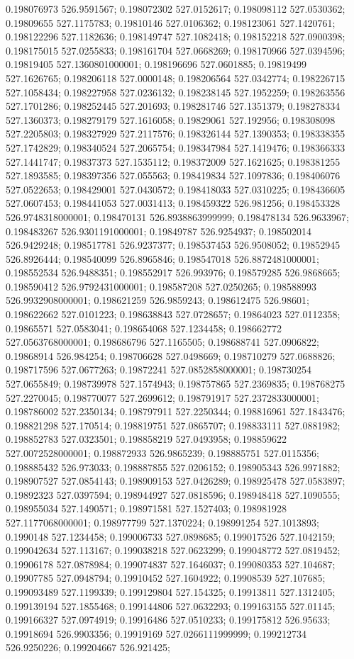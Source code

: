 0.198076973 526.9591567; 0.198072302 527.0152617; 0.198098112 527.0530362; 0.19809655 527.1175783; 0.19810146 527.0106362; 0.198123061 527.1420761; 0.198122296 527.1182636; 0.198149747 527.1082418; 0.198152218 527.0900398; 0.198175015 527.0255833; 0.198161704 527.0668269; 0.198170966 527.0394596; 0.19819405 527.1360801000001; 0.198196696 527.0601885; 0.19819499 527.1626765; 0.198206118 527.0000148; 0.198206564 527.0342774; 0.198226715 527.1058434; 0.198227958 527.0236132; 0.198238145 527.1952259; 0.198263556 527.1701286; 0.198252445 527.201693; 0.198281746 527.1351379; 0.198278334 527.1360373; 0.198279179 527.1616058; 0.19829061 527.192956; 0.198308098 527.2205803; 0.198327929 527.2117576; 0.198326144 527.1390353; 0.198338355 527.1742829; 0.198340524 527.2065754; 0.198347984 527.1419476; 0.198366333 527.1441747; 0.19837373 527.1535112; 0.198372009 527.1621625; 0.198381255 527.1893585; 0.198397356 527.055563; 0.198419834 527.1097836; 0.198406076 527.0522653; 0.198429001 527.0430572; 0.198418033 527.0310225; 0.198436605 527.0607453; 0.198441053 527.0031413; 0.198459322 526.981256; 0.198453328 526.9748318000001; 0.198470131 526.8938863999999; 0.198478134 526.9633967; 0.198483267 526.9301191000001; 0.19849787 526.9254937; 0.198502014 526.9429248; 0.198517781 526.9237377; 0.198537453 526.9508052; 0.19852945 526.8926444; 0.198540099 526.8965846; 0.198547018 526.8872481000001; 0.198552534 526.9488351; 0.198552917 526.993976; 0.198579285 526.9868665; 0.198590412 526.9792431000001; 0.198587208 527.0250265; 0.198588993 526.9932908000001; 0.198621259 526.9859243; 0.198612475 526.98601; 0.198622662 527.0101223; 0.198638843 527.0728657; 0.19864023 527.0112358; 0.19865571 527.0583041; 0.198654068 527.1234458; 0.198662772 527.0563768000001; 0.198686796 527.1165505; 0.198688741 527.0906822; 0.19868914 526.984254; 0.198706628 527.0498669; 0.198710279 527.0688826; 0.198717596 527.0677263; 0.19872241 527.0852858000001; 0.198730254 527.0655849; 0.198739978 527.1574943; 0.198757865 527.2369835; 0.198768275 527.2270045; 0.198770077 527.2699612; 0.198791917 527.2372833000001; 0.198786002 527.2350134; 0.198797911 527.2250344; 0.198816961 527.1843476; 0.198821298 527.170514; 0.198819751 527.0865707; 0.198833111 527.0881982; 0.198852783 527.0323501; 0.198858219 527.0493958; 0.198859622 527.0072528000001; 0.198872933 526.9865239; 0.198885751 527.0115356; 0.198885432 526.973033; 0.198887855 527.0206152; 0.198905343 526.9971882; 0.198907527 527.0854143; 0.198909153 527.0426289; 0.198925478 527.0583897; 0.19892323 527.0397594; 0.198944927 527.0818596; 0.198948418 527.1090555; 0.198955034 527.1490571; 0.198971581 527.1527403; 0.198981928 527.1177068000001; 0.198977799 527.1370224; 0.198991254 527.1013893; 0.1990148 527.1234458; 0.199006733 527.0898685; 0.199017526 527.1042159; 0.199042634 527.113167; 0.199038218 527.0623299; 0.199048772 527.0819452; 0.19906178 527.0878984; 0.199074837 527.1646037; 0.199080353 527.104687; 0.19907785 527.0948794; 0.19910452 527.1604922; 0.19908539 527.107685; 0.199093489 527.1199339; 0.199129804 527.154325; 0.19913811 527.1312405; 0.199139194 527.1855468; 0.199144806 527.0632293; 0.199163155 527.01145; 0.199166327 527.0974919; 0.19916486 527.0510233; 0.199175812 526.95633; 0.19918694 526.9903356; 0.19919169 527.0266111999999; 0.199212734 526.9250226; 0.199204667 526.921425; 